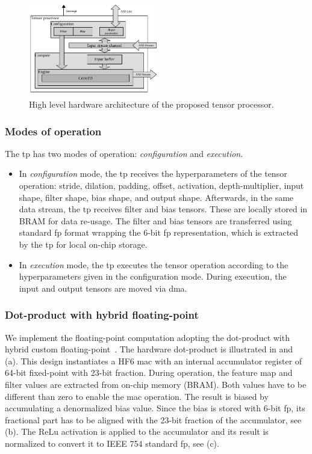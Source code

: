 \begin{figure}[t!]
	\centering
	\includegraphics[width=0.5\textwidth]{./chapters/cnn_accelerator/figures/accelerator.pdf}
	\caption{High level hardware architecture of the proposed tensor processor.}
	\label{fig:accelerator}
\end{figure}
\subsubsection{Modes of operation}
The \gls{tp} has two modes of operation: \emph{configuration} and \emph{execution}.
\begin{itemize}
	\item In \emph{configuration} mode, the \gls{tp} receives the hyperparameters of the tensor operation: stride, dilation, padding, offset, activation, depth-multiplier, input shape, filter shape, bias shape, and output shape. Afterwards, in the same data stream, the \gls{tp} receives filter and bias tensors. These are locally stored in BRAM for data re-usage. The filter and bias tensors are transferred using standard \gls{fp} format wrapping the 6-bit \gls{fp} representation, which is extracted by the \gls{tp} for local on-chip storage.
	
	\item In \emph{execution} mode, the \gls{tp} executes the tensor operation according to the hyperparameters given in the configuration mode. During execution, the input and output tensors are moved via \gls{dma}.
\end{itemize}
\subsubsection{Dot-product with hybrid floating-point}
\label{sec:dot_product}
We implement the floating-point computation adopting the dot-product with hybrid custom floating-point~\cite{nevarez2021accelerating}. The hardware dot-product is illustrated in  and (a). This design instantiates a HF6 \gls{mac} with an internal accumulator register of 64-bit fixed-point with 23-bit fraction. During operation, the feature map and filter values are extracted from on-chip memory (BRAM). Both values have to be different than zero to enable the \gls{mac} operation. The result is biased by accumulating a denormalized bias value. Since the bias is stored with 6-bit \gls{fp}, its fractional part has to be aligned with the 23-bit fraction of the accumulator, see (b). The ReLu activation is applied to the accumulator and its result is normalized to convert it to IEEE 754 standard \gls{fp}, see (c).

